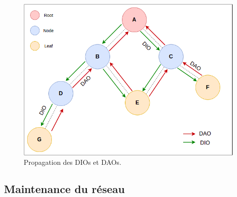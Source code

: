 \begin{figure}[H]
    \centering
    \includegraphics[scale=0.5]{res/dao-dio.drawio.png}
    \caption{Propagation des DIOs et DAOs.}
    \label{fig:state-dio-dao}
\end{figure}

\subsection{Maintenance du réseau}


